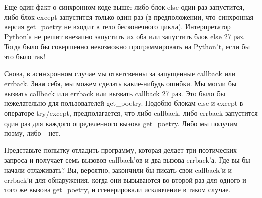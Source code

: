 Еще один факт о синхронном коде выше: либо блок else один раз запустится, 
либо блок except запустится только один раз (в предположении, что 
синхронная версия get\_poetry не входит в тело бесконечного цикла). 
Интерпретатор Python'а не решит внезапно запустить их оба или запустить 
блок else 27 раз. Тогда было бы совершенно невозможно программировать 
на Python't, если бы это было так! 


Снова, в асинхронном случае мы ответсвенны за запущенные callback 
или errback. Зная себя, мы можем сделать какие-нибудь ошибки. Мы могли 
бы вызвать callback или errback или вызвать callback 27 раз. 
Это было бы нежелательно для пользователей get\_poetry. 
Подобно блокам else и except в операторе try/except, предполагается, что 
либо callback, либо errback запустится один раз для 
каждого определенного вызова get\_poetry. Либо мы получим поэму, 
либо - нет. 


Представьте попытку отладить программу, которая делает 
три поэтических запроса и получает семь вызовов 
callback'ов и два вызова errback'а. Где вы бы начали 
отлаживать? Вы, вероятно, закончили бы писать свои callback'и и 
errback'и для обнаружения, когда они вызываются во второй раз 
для одного и того же вызова get\_poetry, и сгенерировали 
исключение в таком случае.  


